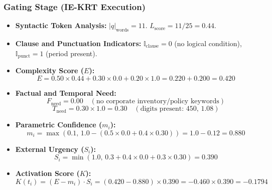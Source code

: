 \subsubsection{Gating Stage (IE-KRT Execution)}
\begin{itemize}
    \item \textbf{Syntactic Token Analysis:} $|q|_{\text{words}} = 11$. $L_{\text{score}} = 11 / 25 = 0.44$.
    \item \textbf{Clause and Punctuation Indicators:} $\mathbb{I}_{\text{clause}} = 0$ (no logical condition), $\mathbb{I}_{\text{punct}} = 1$ (period present).
    \item \textbf{Complexity Score ($E$):}
    \begin{equation}
        E = 0.50 \times 0.44 + 0.30 \times 0.0 + 0.20 \times 1.0 = 0.220 + 0.200 = 0.420
    \end{equation}
    \item \textbf{Factual and Temporal Need:}
    \begin{equation}
        F_{\text{need}} = 0.00 \quad (\text{no corporate inventory/policy keywords})
    \end{equation}
    \begin{equation}
        T_{\text{need}} = 0.30 \times 1.0 = 0.30 \quad (\text{digits present: 450, 1.08})
    \end{equation}
    \item \textbf{Parametric Confidence ($m_i$):}
    \begin{equation}
        m_i = \max(0.1, \, 1.0 - (0.5 \times 0.0 + 0.4 \times 0.30)) = 1.0 - 0.12 = 0.880
    \end{equation}
    \item \textbf{External Urgency ($S_i$):}
    \begin{equation}
        S_i = \min(1.0, \, 0.3 + 0.4 \times 0.0 + 0.3 \times 0.30) = 0.390
    \end{equation}
    \item \textbf{Activation Score ($K$):}
    \begin{equation}
        K(t_i) = (E - m_i) \cdot S_i = (0.420 - 0.880) \times 0.390 = -0.460 \times 0.390 = \mathbf{-0.1794}
    \end{equation}
\end{itemize}

